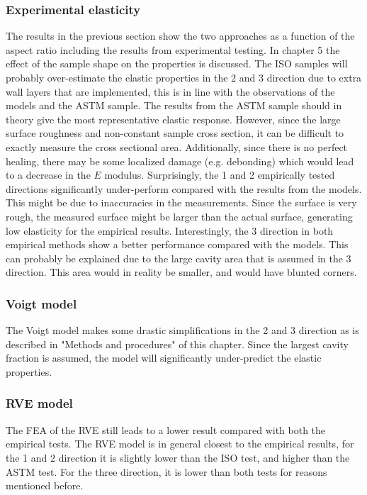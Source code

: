 \subsubsection{Experimental elasticity}
The results in the previous section show the two approaches as a function of the aspect ratio including the results from experimental testing. In chapter 5 the effect of the sample shape on the properties is discussed. The ISO samples will probably over-estimate the elastic properties in the 2 and 3 direction due to extra wall layers that are implemented, this is in line with the observations of the models and the ASTM sample. The results from the ASTM sample should in theory give the most representative elastic response. However, since the large surface roughness and non-constant sample cross section, it can be difficult to exactly measure the cross sectional area. Additionally, since there is no perfect healing, there may be some localized damage (e.g. debonding) which would lead to a decrease in the $E$ modulus. Surprisingly, the 1 and 2 empirically tested directions significantly under-perform compared with the results from the models. This might be due to inaccuracies in the measurements. Since the surface is very rough, the measured surface might be larger than the actual surface, generating low elasticity for the empirical results. Interestingly, the 3 direction in both empirical methods show a better performance compared with the models. This can probably be explained due to the large cavity area that is assumed in the 3 direction. This area would in reality be smaller, and would have blunted corners.

\subsubsection{Voigt model}
The Voigt model makes some drastic simplifications in the 2 and 3 direction as is described in "Methods and procedures" of this chapter. Since the largest cavity fraction is assumed, the model will significantly under-predict the elastic properties. 

\subsubsection{RVE model}
The FEA of the RVE still leads to a lower result compared with both the empirical tests. The RVE model is in general closest to the empirical results, for the 1 and 2 direction it is slightly lower than the ISO test, and higher than the ASTM test. For the three direction, it is lower than both tests for reasons mentioned before.

